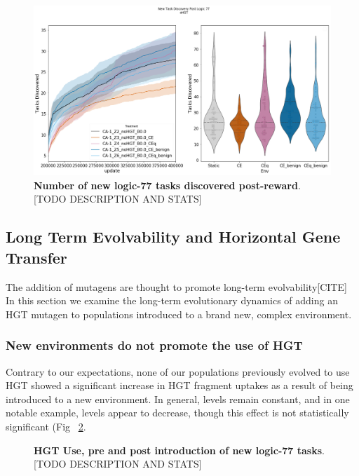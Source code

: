 \documentclass[PhD]{msu-thesis}
\begin{document}
	\begin{figure}[!h]
	\includegraphics[trim={0 0 0 0}, clip, width=0.75\columnwidth]{figures/LTE/lte-complex-post_reward_task_discovery.png}
	\caption{\textbf{Number of new logic-77 tasks discovered post-reward}. [TODO DESCRIPTION AND STATS]%
	}
	\label{fig:complex-task_discovery}
	\end{figure}


\subsection{Long Term Evolvability and Horizontal Gene Transfer}
The addition of mutagens are thought to promote long-term evolvability[CITE] In this section we examine the long-term evolutionary dynamics of adding an HGT mutagen to populations introduced to a brand new, complex environment.

\subsubsection{New environments do not promote the use of HGT}
Contrary to our expectations, none of our populations previously evolved to use HGT showed a significant increase in HGT fragment uptakes as a result of being introduced to a new environment. In general, levels remain constant, and in one notable example, levels appear to decrease, though this effect is not statistically significant (Fig ~\ref{fig:lte-hgt_use}.

	\begin{figure}[!h]
	\caption{\textbf{HGT Use, pre and post introduction of new logic-77 tasks}. [TODO DESCRIPTION AND STATS]%
	}
	\label{fig:lte-hgt_use}
	\end{figure}
\end{document}
